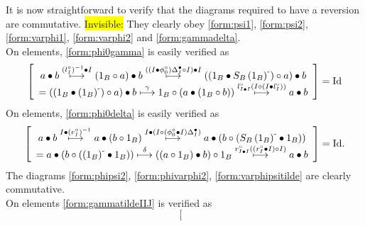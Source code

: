 \documentclass[nosumlimits,twoside]{amsart}
\theoremstyle{definition}
\theoremstyle{remark}
\def\revsn{\text{-}}
\newenvironment{invisible}{{\noindent\sc \colorbox{yellow}{Invisible:}\;}\color{gray}}{\medskip}
\begin{document}
It is now straightforward to verify that the diagrams required to have a reversion are commutative.
\begin{invisible}
 They clearly obey \eqref{form:psi1}, \eqref{form:psi2}, \eqref{form:varphi1}, \eqref{form:varphi2} and \eqref{form:gammadelta}.\\
 On elements, \eqref{form:phi0gamma} is  easily verified as
 \begin{equation*}
\left[
\begin{array}{c}
a\bullet b\overset{\left( l_{I}^{\circ }\right) ^{-1}\bullet I}{\longmapsto }%
\left( 1_{B}\circ a\right) \bullet b\overset{\left( \left( I\bullet \phi
_{0}^{\circ }\right) \Delta _{I}^{\bullet }\circ I\right) \bullet I}{%
\longmapsto }\left( \left( 1_{B}\bullet S_{B}\left( 1_{B}\right) ^{\revsn
}\right) \circ a\right) \bullet b \\
=\left( \left( 1_{B}\bullet \left( 1_{B}\right) ^{\revsn }\right) \circ
a\right) \bullet b\overset{\gamma }{\longmapsto }1_{B}\circ \left( a\bullet
\left( 1_{B}\circ b\right) \right) \overset{l_{I\bullet I}^{\circ }\left(
I\circ \left( I\bullet l_{I}^{\circ }\right) \right) }{\longmapsto }a\bullet
b%
\end{array}%
\right] =\mathrm{Id}
\end{equation*}
On elements, \eqref{form:phi0delta}  is easily verified as
\begin{equation*}
\left[
\begin{array}{c}
a\bullet b\overset{I\bullet \left( r_{I}^{\circ }\right) ^{-1}}{\longmapsto }%
a\bullet \left( b\circ 1_{B}\right) \overset{I\bullet \left( I\circ \left(
\phi _{0}^{\circ }\bullet I\right) \Delta _{I}^{\bullet }\right) }{%
\longmapsto }a\bullet \left( b\circ \left( S_{B}\left( 1_{B}\right) ^{\revsn
}\bullet 1_{B}\right) \right)  \\
=a\bullet \left( b\circ \left( \left( 1_{B}\right) ^{\revsn }\bullet
1_{B}\right) \right) \overset{\delta }{\longmapsto }\left( \left( a\circ
1_{B}\right) \bullet b\right) \circ 1_{B}\overset{r_{I\bullet I}^{\circ
}\left( \left( r_{I}^{\circ }\bullet I\right) \circ I\right) }{\longmapsto }%
a\bullet b%
\end{array}%
\right] =\mathrm{Id.}
\end{equation*}
The diagrams \eqref{form:phipsi2}, \eqref{form:phivarphi2}, \eqref{form:varphipsitilde} are clearly commutative.\\
On elements \eqref{form:gammatildeIIJ} is verified as
\begin{equation*}
\left[
\begin{array}{c}

\end{array}
\end{equation*}
\end{invisible}
\end{document}
